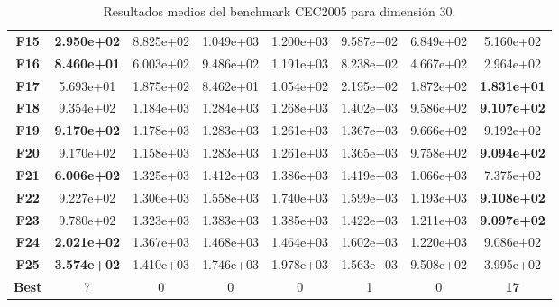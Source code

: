 \begin{table}
{\begin{tabular}{cccccccc}
		\midrule
		\textbf{F15}  &  \textbf{2.950e+02} &  8.825e+02 &  1.049e+03 &  1.200e+03 &  9.587e+02 &  6.849e+02 &  5.160e+02 \\
		\textbf{F16}  &  \textbf{8.460e+01} &  6.003e+02 &  9.486e+02 &  1.191e+03 &  8.238e+02 &  4.667e+02 &  2.964e+02 \\
		\textbf{F17}  &  5.693e+01 &  1.875e+02 &  8.462e+01 &  1.054e+02 &  2.195e+02 &  1.872e+02 &  \textbf{1.831e+01} \\
		\textbf{F18}  &  9.354e+02 &  1.184e+03 &  1.284e+03 &  1.268e+03 &  1.402e+03 &  9.586e+02 &  \textbf{9.107e+02} \\
		\textbf{F19}  &  \textbf{9.170e+02} &  1.178e+03 &  1.283e+03 &  1.261e+03 &  1.367e+03 &  9.666e+02 &  9.192e+02 \\
		\textbf{F20}  &  9.170e+02 &  1.158e+03 &  1.283e+03 &  1.261e+03 &  1.365e+03 &  9.758e+02 &  \textbf{9.094e+02} \\
		\textbf{F21}  &  \textbf{6.006e+02} &  1.325e+03 &  1.412e+03 &  1.386e+03 &  1.419e+03 &  1.066e+03 &  7.375e+02 \\
		\textbf{F22}  &  9.227e+02 &  1.306e+03 &  1.558e+03 &  1.740e+03 &  1.599e+03 &  1.193e+03 &  \textbf{9.108e+02} \\
		\textbf{F23}  &  9.780e+02 &  1.323e+03 &  1.383e+03 &  1.385e+03 &  1.422e+03 &  1.211e+03 &  \textbf{9.097e+02} \\
		\textbf{F24}  &  \textbf{2.021e+02} &  1.367e+03 &  1.468e+03 &  1.464e+03 &  1.602e+03 &  1.220e+03 &  9.086e+02 \\
		\textbf{F25}  &  \textbf{3.574e+02} &  1.410e+03 &  1.746e+03 &  1.978e+03 &  1.563e+03 &  9.508e+02 &  3.995e+02 \\
		\midrule
		\textbf{Best} &          7 &          0 &          0 &          0 &          1 &          0 &         \textbf{17} \\
		\bottomrule
\end{tabular}}
	\caption{Resultados medios del benchmark CEC2005 para dimensión 30.}\label{t:resultados-30}
\end{table}

